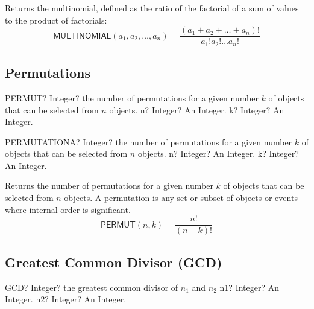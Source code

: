 \vspace{0.3cm}
Returns the multinomial, defined as  the ratio of the factorial of a sum of values to the product of factorials:
\begin{equation}
	\textsf{MULTINOMIAL}(a_1,a_2,\ldots,a_n) = \frac{(a_1+a_2+\ldots+a_n)!}{a_1! a_2! \ldots a_n!}
\end{equation}





\subsection{Permutations}

\begin{mpFunctionsExtract}
	\mpWorksheetFunctionTwoNotImplemented
	{PERMUT? Integer? the number of permutations for a given number $k$ of objects that can be selected from $n$ objects.}
	{n? Integer? An Integer.}
	{k? Integer? An Integer.}
\end{mpFunctionsExtract}

\vspace{0.3cm}
\begin{mpFunctionsExtract}
	\mpWorksheetFunctionTwoNotImplemented
	{PERMUTATIONA? Integer? the number of permutations for a given number $k$ of objects that can be selected from $n$ objects.}
	{n? Integer? An Integer.}
	{k? Integer? An Integer.}
\end{mpFunctionsExtract}

\vspace{0.3cm}
Returns the number of permutations for a given number $k$ of objects that can be selected from $n$ objects. A permutation is any set or subset of objects or events where internal order is significant.
\begin{equation}
	\textsf{PERMUT}(n, k) = \frac{n!}{(n-k)!}
\end{equation}



\subsection{Greatest Common Divisor (GCD)}


\vspace{0.6cm}
\begin{mpFunctionsExtract}
	\mpWorksheetFunctionTwoNotImplemented
	{GCD? Integer? the greatest common divisor of $n_1$ and $n_2$}
	{n1? Integer? An Integer.}
	{n2? Integer? An Integer.}
\end{mpFunctionsExtract}

